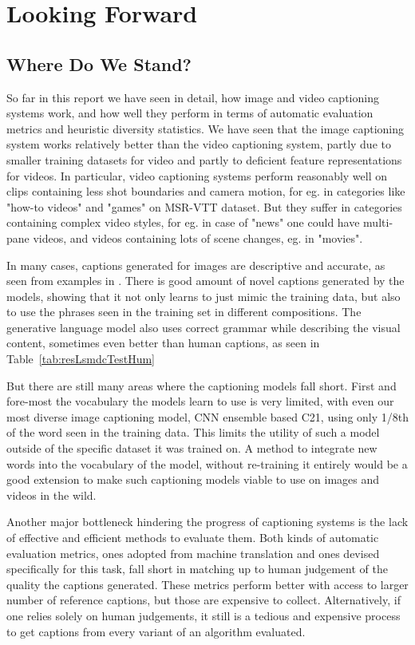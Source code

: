 \chapter{Looking Forward}
\label{chapter:discussion}
\section{Where Do We Stand?}

So far in this report we have seen in detail, how image and video captioning
systems work, and how well they perform in terms of automatic evaluation
metrics and heuristic diversity statistics.
We have seen that the image captioning system works relatively better than the
video captioning system, partly due to smaller training datasets for video and
partly to deficient feature representations for videos.
In particular, video captioning systems perform reasonably well on clips
containing less shot boundaries and camera motion, for eg. in categories like
"how-to videos" and "games" on MSR-VTT dataset.
But they suffer in categories containing complex video styles, for eg. in case
of "news" one could have multi-pane videos, and videos containing lots of scene
changes, eg. in "movies".

In many cases, captions generated for images are descriptive and accurate, as
seen from examples in .
There is good amount of novel captions generated by the models, showing that it
not only learns to just mimic the training data, but also to use the phrases
seen in the training set in different compositions.
The generative language model also uses correct grammar while describing the
visual content, sometimes even better than human captions, as seen in
Table~\ref{tab:resLsmdcTestHum}

But there are still many areas where the captioning models fall short.
First and fore-most the vocabulary the models learn to use is very limited,
with even our most diverse image captioning model, CNN ensemble based C21,
using only 1/8th of the word seen in the training data. 
This limits the utility of such a model outside of the specific dataset it was
trained on.
A method to integrate new words into the vocabulary of the model, without
re-training it entirely would be a good extension to make such captioning
models viable to use on images and videos in the wild.

Another major bottleneck hindering the progress of captioning systems is the
lack of effective and efficient methods to evaluate them.
Both kinds of automatic evaluation metrics, ones adopted from machine
translation and ones devised specifically for this task, fall short in matching
up to human judgement of the quality the captions generated.
These metrics perform better with access to larger number of reference
captions, but those are expensive to collect.
Alternatively, if one relies solely on human judgements, it still is a tedious
and expensive process to get captions from every variant of an algorithm
evaluated.

